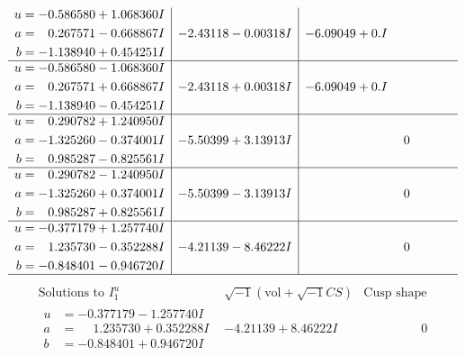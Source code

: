 \documentclass[1p]{elsarticle_modified}
\theoremstyle{definition}
\newcommand{\I}{\sqrt{-1}}
\begin{document}
$$\begin{array}{c|c|c}
\begin{aligned}
u &= -0.586580 + 1.068360 I \\
a &= \phantom{-}0.267571 - 0.668867 I \\
b &= -1.138940 + 0.454251 I\end{aligned}
 & -2.43118 - 0.00318 I & -6.09049 + 0. I\phantom{ +0.000000I} \\ \hline\begin{aligned}
u &= -0.586580 - 1.068360 I \\
a &= \phantom{-}0.267571 + 0.668867 I \\
b &= -1.138940 - 0.454251 I\end{aligned}
 & -2.43118 + 0.00318 I & -6.09049 + 0. I\phantom{ +0.000000I} \\ \hline\begin{aligned}
u &= \phantom{-}0.290782 + 1.240950 I \\
a &= -1.325260 - 0.374001 I \\
b &= \phantom{-}0.985287 - 0.825561 I\end{aligned}
 & -5.50399 + 3.13913 I & \phantom{-0.000000 } 0 \\ \hline\begin{aligned}
u &= \phantom{-}0.290782 - 1.240950 I \\
a &= -1.325260 + 0.374001 I \\
b &= \phantom{-}0.985287 + 0.825561 I\end{aligned}
 & -5.50399 - 3.13913 I & \phantom{-0.000000 } 0 \\ \hline\begin{aligned}
u &= -0.377179 + 1.257740 I \\
a &= \phantom{-}1.235730 - 0.352288 I \\
b &= -0.848401 - 0.946720 I\end{aligned}
 & -4.21139 - 8.46222 I & \phantom{-0.000000 } 0\\
 \hline 
 \end{array}$$\newpage$$\begin{array}{c|c|c}  
\text{Solutions to }I^u_{1}& \I (\text{vol} + \sqrt{-1}CS) & \text{Cusp shape}\\
 \hline 
\begin{aligned}
u &= -0.377179 - 1.257740 I \\
a &= \phantom{-}1.235730 + 0.352288 I \\
b &= -0.848401 + 0.946720 I\end{aligned}
 & -4.21139 + 8.46222 I & \phantom{-0.000000 } 0 \\ \hline\begin{aligned}

\end{aligned}
\end{array}$$
\end{document}
